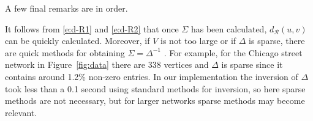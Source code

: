 \documentclass[alpha-refs]{wiley-article}
\begin{document}

A few final remarks are in order. 

It follows from \eqref{e:d-R1} and \eqref{e:d-R2} that once $\Sigma$ has been calculated, $d_{\mathcal{R}}(u,v)$ can be quickly calculated. 
Moreover, if $V$ is not too large or if $\Delta$ is sparse, there are quick methods for obtaining $\Sigma=\Delta^{-1}$ \citep[see e.g.][]{rue:held}. For example, for
the Chicago street network in Figure~\ref{fig:data} there are 338 vertices and $\Delta$ is sparse since it contains around 1.2\% non-zero entries. In our implementation the inversion of $\Delta$ took less than a 0.1 second using standard methods for inversion, so here sparse methods are not necessary, but for larger networks sparse methods may become relevant.

\end{document}
